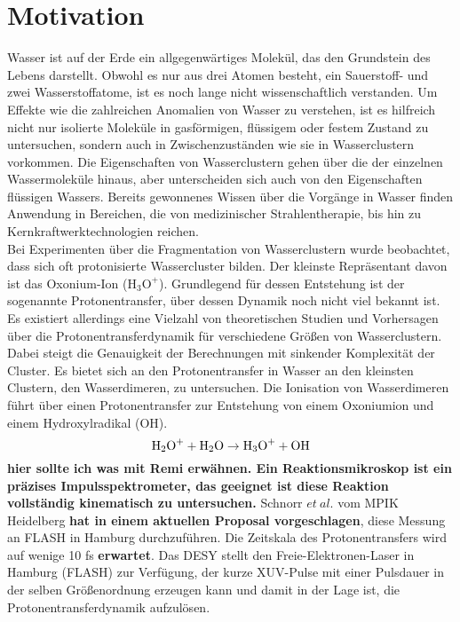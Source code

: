 
  \chapter{Motivation} \label{sec:Motivation}
  
Wasser ist auf der Erde ein allgegenwärtiges Molekül, das den Grundstein des Lebens darstellt.
Obwohl es nur aus drei Atomen besteht, ein Sauerstoff- und zwei Wasserstoffatome, ist es noch lange nicht wissenschaftlich verstanden. Um Effekte wie die zahlreichen Anomalien von Wasser \cite{WAS} zu verstehen, ist es hilfreich nicht nur isolierte Moleküle in gasförmigen, flüssigem oder festem Zustand zu untersuchen, sondern auch in Zwischenzuständen wie sie in Wasserclustern vorkommen. Die Eigenschaften von Wasserclustern gehen über die der einzelnen Wassermoleküle hinaus, aber unterscheiden sich auch von den Eigenschaften flüssigen Wassers. Bereits gewonnenes Wissen über die Vorgänge in Wasser finden Anwendung in Bereichen, die von medizinischer Strahlentherapie, bis hin zu Kernkraftwerktechnologien reichen.\\
Bei Experimenten über die Fragmentation von Wasserclustern wurde beobachtet, dass sich oft protonisierte Wassercluster bilden. Der kleinste Repräsentant davon ist das Oxonium-Ion ($\mathrm{H_3O^+}$). Grundlegend für dessen Entstehung ist der sogenannte Protonentransfer, über dessen Dynamik noch nicht viel bekannt ist. Es existiert allerdings eine Vielzahl von theoretischen Studien und Vorhersagen über die Protonentransferdynamik für verschiedene Größen von Wasserclustern. Dabei steigt die Genauigkeit der Berechnungen mit sinkender Komplexität der Cluster. Es bietet sich an den Protonentransfer in Wasser an den kleinsten Clustern, den Wasserdimeren, zu untersuchen. Die Ionisation von Wasserdimeren führt über einen Protonentransfer zur Entstehung von einem Oxoniumion und einem Hydroxylradikal (OH).
  \begin{equation}
  \textmd{H}_2\textmd{O}^+ + \textmd{H}_2\textmd{O} \rightarrow \textmd{H}_3\textmd{O}^+ + \textmd{O}\textmd{H} 
  \end{equation} 
\textbf{hier sollte ich was mit Remi erwähnen. Ein Reaktionsmikroskop ist ein präzises Impulsspektrometer, das geeignet ist diese Reaktion vollständig kinematisch zu untersuchen.}
Schnorr $et \ al.$ vom MPIK Heidelberg \textbf{hat in einem aktuellen Proposal vorgeschlagen}, diese Messung an FLASH in Hamburg durchzuführen. Die Zeitskala des Protonentransfers wird auf wenige 10 fs \textbf{erwartet}. Das DESY stellt den Freie-Elektronen-Laser in Hamburg (FLASH) zur Verfügung, der kurze XUV-Pulse mit einer Pulsdauer in der selben Größenordnung erzeugen kann und damit in der Lage ist, die Protonentransferdynamik aufzulösen. \\

